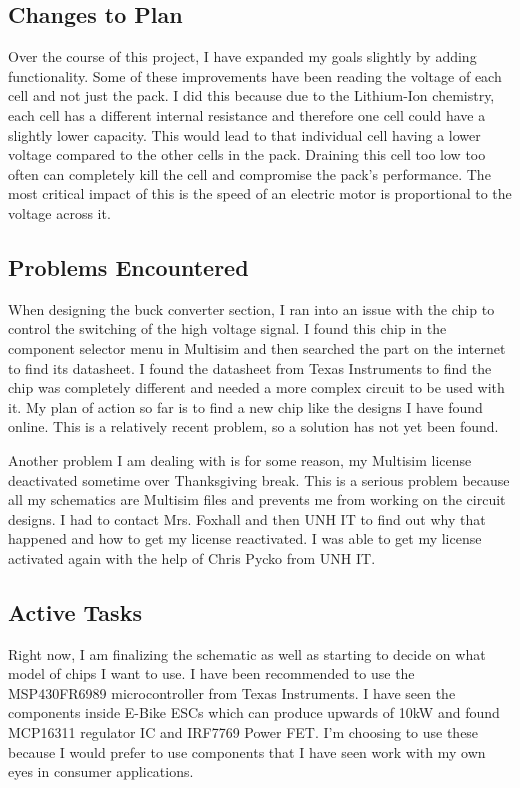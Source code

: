 \documentclass[conference]{IEEEtran}
\begin{document}
\subsection{Changes to Plan}

Over the course of this project, I have expanded my goals slightly by adding functionality. Some of these improvements have been reading the voltage of each cell and not just the pack. I did this because due to the Lithium-Ion chemistry, each cell has a different internal resistance and therefore one cell could have a slightly lower capacity. This would lead to that individual cell having a lower voltage compared to the other cells in the pack. Draining this cell too low too often can completely kill the cell and compromise the pack's performance. The most critical impact of this is the speed of an electric motor is proportional to the voltage across it.

\subsection{Problems Encountered}

When designing the buck converter section, I ran into an issue with the chip to control the switching of the high voltage signal. I found this chip in the component selector menu in Multisim and then searched the part on the internet to find its datasheet. I found the datasheet from Texas Instruments to find the chip was completely different and needed a more complex circuit to be used with it. My plan of action so far is to find a new chip like the designs I have found online. This is a relatively recent problem, so a solution has not yet been found.
\par Another problem I am dealing with is for some reason, my Multisim license deactivated sometime over Thanksgiving break. This is a serious problem because all my schematics are Multisim files and prevents me from working on the circuit designs. I had to contact Mrs. Foxhall and then UNH IT to find out why that happened and how to get my license reactivated. I was able to get my license activated again with the help of Chris Pycko from UNH IT.

\subsection{Active Tasks}

Right now, I am finalizing the schematic as well as starting to decide on what model of chips I want to use. I have been recommended to use the MSP430FR6989 microcontroller from Texas Instruments. I have seen the components inside E-Bike ESCs which can produce upwards of 10kW and found MCP16311 regulator IC and IRF7769 Power FET. I'm choosing to use these because I would prefer to use components that I have seen work with my own eyes in consumer applications.
\end{document}
